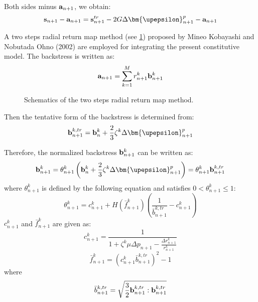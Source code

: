 Both sides minus ${{\bf{a}}_{n + 1}}$, we obtain:
\begin{equation}
\label{Equ:sminusa1}
{{\bf{s}}_{n + 1}} - {{\bf{a}}_{n + 1}} = {\bf{s}}_{n + 1}^{tr} - 2G\Delta {\bm{\upepsilon }}_{n + 1}^p - {{\bf{a}}_{n + 1}}
\end{equation}

A two steps radial return map method (see \ref{Fig:radial_return_map}) proposed by Mineo Kobayashi and Nobutada Ohno (2002) \cite{kobayashi2002implementation} are employed for integrating the present constitutive model. The backstress is written as:
\begin{equation}
{{\bf{a}}_{n + 1}} = \sum\limits_{k = 1}^M {r_{n + 1}^k{\bf{b}}_{n + 1}^k}
\end{equation}
\begin{figure}[!htp]
\centering{}
\caption{Schematics of the two steps radial return map method.}
\label{Fig:radial_return_map}
\end{figure}

Then the tentative form of the backstress is determined from:
\begin{equation}
\label{Equ:btrn+1}
{\bf{b}}_{n + 1}^{k,tr} = {\bf{b}}_n^k + \frac{2}{3}{\zeta ^k}\Delta {\bm{\upepsilon }}_{n + 1}^p
\end{equation}

Therefore, the normalized backstress ${\bf{b}}_{n + 1}^k$ can be written as:
\begin{equation}
\label{Equ:bn+1}
{\bf{b}}_{n + 1}^k = \theta _{n + 1}^k\left( {{\bf{b}}_n^k + \frac{2}{3}{\zeta ^k}\Delta {\bm{\upepsilon }}_{n + 1}^p} \right) = \theta _{n + 1}^k{\bf{b}}_{n + 1}^{k,tr}
\end{equation}
where $\theta _{n + 1}^k$ is defined by the following equation and satisfies $0 < \theta _{n + 1}^k \leqslant 1$:
\begin{equation}
\label{Equ:thetan+1}
\theta _{n + 1}^k = c_{n + 1}^k + H\left( {\bar f_{n + 1}^k} \right)\left( {\frac{1}{{\bar b_{n + 1}^{k,tr}}} - c_{n + 1}^k} \right)
\end{equation}
$c_{n + 1}^k$ and ${\bar f_{n + 1}^k}$ are given as:
\begin{equation}
c_{n + 1}^k = \frac{1}{{1 + {\zeta ^k}\mu \Delta {p_{n + 1}} - \frac{{\Delta r_{n + 1}^k}}{{r_{n + 1}^k}}}}
\end{equation}
\begin{equation}
\bar f_{n + 1}^k = {\left( {c_{n + 1}^k\bar b_{n + 1}^{k,tr}} \right)^2} - 1
\end{equation}
where
\begin{equation}
\bar b_{n + 1}^{k,tr} = \sqrt {\frac{3}{2}{\bf{b}}_{n + 1}^{k,tr}:{\bf{b}}_{n + 1}^{k,tr}}
\end{equation}

